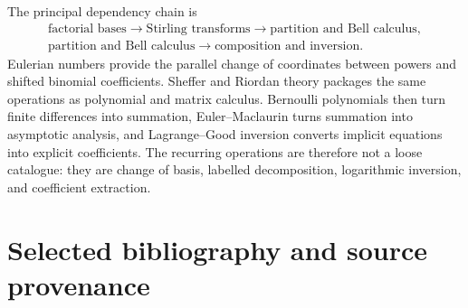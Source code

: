 \documentclass[11pt,a4paper,oneside,openany]{book}
\theoremstyle{definition}
\theoremstyle{remark}
\begin{document}
The principal dependency chain is
\[
 \begin{gathered}
 \text{factorial bases}
 \longrightarrow \text{Stirling transforms}
 \longrightarrow \text{partition and Bell calculus},\\
 \text{partition and Bell calculus}
 \longrightarrow \text{composition and inversion}.
 \end{gathered}
\]
Eulerian numbers provide the parallel change of coordinates between powers and
shifted binomial coefficients. Sheffer and Riordan theory packages the same
operations as polynomial and matrix calculus. Bernoulli polynomials then turn
finite differences into summation, Euler--Maclaurin turns summation into
asymptotic analysis, and Lagrange--Good inversion converts implicit equations
into explicit coefficients. The recurring operations are therefore not a
loose catalogue: they are change of basis, labelled decomposition, logarithmic
inversion, and coefficient extraction.


\backmatter

\chapter*{Selected bibliography and source provenance}
\end{document}
